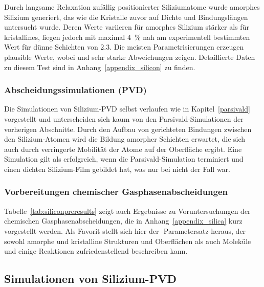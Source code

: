 Durch langsame Relaxation zufällig positionierter Siliziumatome wurde amorphes Silizium generiert, das wie die Kristalle zuvor auf Dichte und Bindungslängen untersucht wurde.
Deren Werte variieren für amorphes Silizium stärker als für kristallines, liegen jedoch mit maximal \SI{4}{\percent} nah am experimentell bestimmten Wert für dünne Schichten von \SI{2.3}{\gpcc}\cite{remes_optical_1998}.
Die meisten Parametrisierungen erzeugen plausible Werte, wobei  und  sehr starke Abweichungen zeigen.
Detaillierte Daten zu diesem Test sind in Anhang~\ref{appendix_silicon} zu finden.

\subsubsection{Abscheidungssimulationen (PVD)}

Die Simulationen von Silizium-PVD selbst verlaufen wie in Kapitel~\ref{parsivald} vorgestellt und unterscheiden sich kaum von den Parsivald-Simulationen der vorherigen Abschnitte.
Durch den Aufbau von gerichteten Bindungen zwischen den Silizium-Atomen wird die Bildung amorpher Schichten erwartet, die sich auch durch verringerte Mobilität der Atome auf der Oberfläche ergibt.
Eine Simulation gilt als erfolgreich, wenn die Parsivald-Simulation terminiert und einen dichten Silizium-Film gebildet hat, was nur bei  nicht der Fall war.

\subsubsection{Vorbereitungen chemischer Gasphasenabscheidungen}

Tabelle~\ref{tab:siliconpreresults} zeigt auch Ergebnisse zu Voruntersuchungen der chemischen Gasphasenabscheidungen, die in Anhang~\ref{appendix_silica} kurz vorgestellt werden.
Als Favorit stellt sich hier der -Parametersatz heraus, der sowohl amorphe und kristalline Strukturen und Oberflächen als auch Moleküle und einige Reaktionen zufriedenstellend beschreiben kann.

\subsection{Simulationen von Silizium-PVD}

